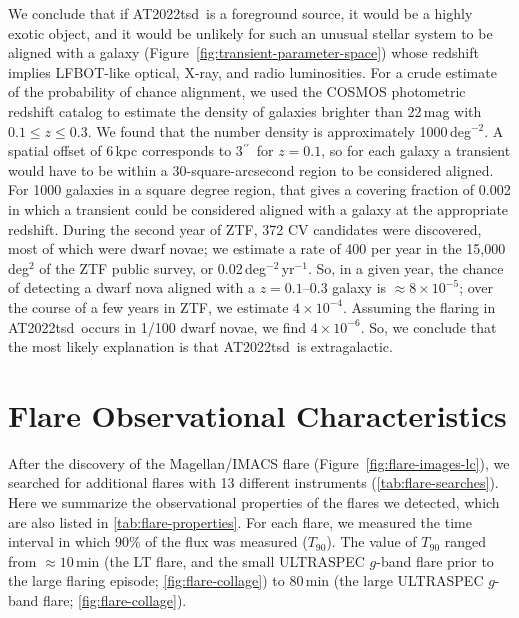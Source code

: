\documentclass{nature_plusfigure}
\newcommand{\at}{AT2022tsd}
\newcommand{\arcsec}{$^{\prime\prime}$}
\begin{document}
\begin{methods}
We conclude that if \at\ is a foreground source, it would be a highly exotic object, and it would be unlikely for such an unusual stellar system to be aligned with a galaxy (Figure~\ref{fig:transient-parameter-space}) whose redshift implies LFBOT-like optical, X-ray, and radio luminosities.
For a crude estimate of the probability of chance alignment, we used the COSMOS photometric redshift catalog\cite{Ilbert2008} to estimate the density of galaxies brighter than 22\,mag with $0.1 \leq z \leq 0.3$. We found that the number density is approximately 1000\,deg$^{-2}$.
A spatial offset of 6\,kpc corresponds to 3\arcsec\ for $z=0.1$, so for each galaxy a transient would have to be within a 30-square-arcsecond region to be considered aligned. For 1000 galaxies in a square degree region, that gives a covering fraction of 0.002 in which a transient could be considered aligned with a galaxy at the appropriate redshift.
During the second year of ZTF, 372 CV candidates were discovered\cite{Szkody2021}, most of which were dwarf novae; we estimate a rate of 400 per year in the 15,000\,deg$^{2}$ of the ZTF public survey, or 0.02\,deg$^{-2}$\,yr$^{-1}$. So, in a given year, the chance of detecting a dwarf nova aligned with a $z=0.1$--0.3 galaxy is $\approx 8\times10^{-5}$; over the course of a few years in ZTF, we estimate $4\times10^{-4}$. Assuming the flaring in \at\ occurs in 1/100 dwarf novae, we find $4\times10^{-6}$.
So, we conclude that the most likely explanation is that \at\ is extragalactic.

\section{Flare Observational Characteristics}
\label{sec:flare-characteristics}

After the discovery of the Magellan/IMACS flare (Figure~\ref{fig:flare-images-lc}), we searched for additional flares with 13 different instruments (\ref{tab:flare-searches}). Here we summarize the observational properties of the flares we detected, which are also listed in \ref{tab:flare-properties}. For each flare, we measured the time interval in which 90\% of the flux was measured ($T_{90}$). The value of $T_{90}$ ranged from $\approx10$\,min (the LT flare, and the small ULTRASPEC $g$-band flare prior to the large flaring episode; \ref{fig:flare-collage}) to 80\,min (the large ULTRASPEC $g$-band flare; \ref{fig:flare-collage}). 


\end{methods}
\end{document}
